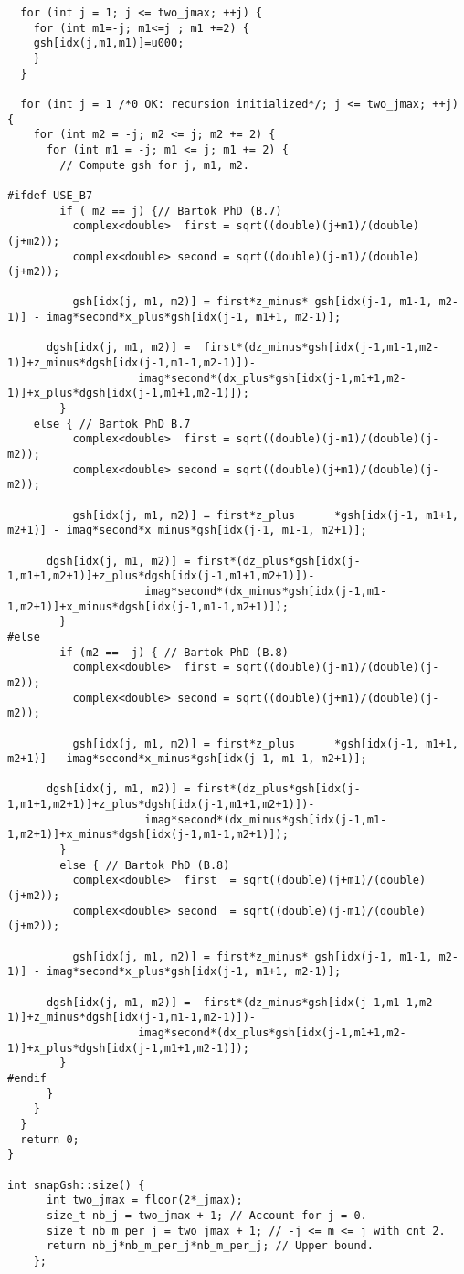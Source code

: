 \documentclass[12pt]{article}
\begin{document}
\begin{lstlisting}
  for (int j = 1; j <= two_jmax; ++j) {
    for (int m1=-j; m1<=j ; m1 +=2) {
	gsh[idx(j,m1,m1)]=u000;
    }
  }

  for (int j = 1 /*0 OK: recursion initialized*/; j <= two_jmax; ++j) {
    for (int m2 = -j; m2 <= j; m2 += 2) {
      for (int m1 = -j; m1 <= j; m1 += 2) {
        // Compute gsh for j, m1, m2.

#ifdef USE_B7
        if ( m2 == j) {// Bartok PhD (B.7)
          complex<double>  first = sqrt((double)(j+m1)/(double)(j+m2));
          complex<double> second = sqrt((double)(j-m1)/(double)(j+m2));

          gsh[idx(j, m1, m2)] = first*z_minus* gsh[idx(j-1, m1-1, m2-1)] - imag*second*x_plus*gsh[idx(j-1, m1+1, m2-1)];

	  dgsh[idx(j, m1, m2)] =  first*(dz_minus*gsh[idx(j-1,m1-1,m2-1)]+z_minus*dgsh[idx(j-1,m1-1,m2-1)])-
					imag*second*(dx_plus*gsh[idx(j-1,m1+1,m2-1)]+x_plus*dgsh[idx(j-1,m1+1,m2-1)]);
        }
	else { // Bartok PhD B.7
          complex<double>  first = sqrt((double)(j-m1)/(double)(j-m2));
          complex<double> second = sqrt((double)(j+m1)/(double)(j-m2));

          gsh[idx(j, m1, m2)] = first*z_plus      *gsh[idx(j-1, m1+1, m2+1)] - imag*second*x_minus*gsh[idx(j-1, m1-1, m2+1)];

	  dgsh[idx(j, m1, m2)] = first*(dz_plus*gsh[idx(j-1,m1+1,m2+1)]+z_plus*dgsh[idx(j-1,m1+1,m2+1)])-
				     imag*second*(dx_minus*gsh[idx(j-1,m1-1,m2+1)]+x_minus*dgsh[idx(j-1,m1-1,m2+1)]);
        }
#else        
        if (m2 == -j) { // Bartok PhD (B.8)
          complex<double>  first = sqrt((double)(j-m1)/(double)(j-m2));
          complex<double> second = sqrt((double)(j+m1)/(double)(j-m2));

          gsh[idx(j, m1, m2)] = first*z_plus      *gsh[idx(j-1, m1+1, m2+1)] - imag*second*x_minus*gsh[idx(j-1, m1-1, m2+1)];

	  dgsh[idx(j, m1, m2)] = first*(dz_plus*gsh[idx(j-1,m1+1,m2+1)]+z_plus*dgsh[idx(j-1,m1+1,m2+1)])-
				     imag*second*(dx_minus*gsh[idx(j-1,m1-1,m2+1)]+x_minus*dgsh[idx(j-1,m1-1,m2+1)]);
        }
        else { // Bartok PhD (B.8)
          complex<double>  first  = sqrt((double)(j+m1)/(double)(j+m2));
          complex<double> second  = sqrt((double)(j-m1)/(double)(j+m2));

          gsh[idx(j, m1, m2)] = first*z_minus* gsh[idx(j-1, m1-1, m2-1)] - imag*second*x_plus*gsh[idx(j-1, m1+1, m2-1)];

	  dgsh[idx(j, m1, m2)] =  first*(dz_minus*gsh[idx(j-1,m1-1,m2-1)]+z_minus*dgsh[idx(j-1,m1-1,m2-1)])-
					imag*second*(dx_plus*gsh[idx(j-1,m1+1,m2-1)]+x_plus*dgsh[idx(j-1,m1+1,m2-1)]);
        }
#endif
      }
    }
  }
  return 0;
}

int snapGsh::size() {
      int two_jmax = floor(2*_jmax);
      size_t nb_j = two_jmax + 1; // Account for j = 0.
      size_t nb_m_per_j = two_jmax + 1; // -j <= m <= j with cnt 2.
      return nb_j*nb_m_per_j*nb_m_per_j; // Upper bound.
    };
        \end{lstlisting}
\end{document}
